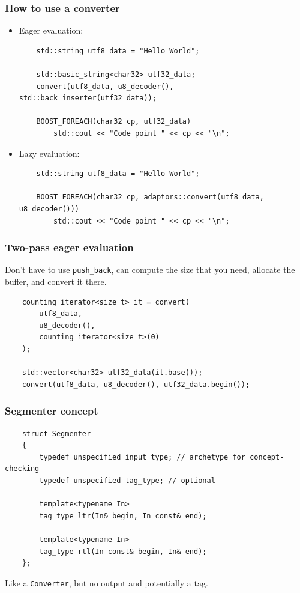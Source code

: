 \documentclass{beamer}
\begin{document}
\begin{frame}[fragile]
	\frametitle{How to use a converter}
	
	\begin{itemize}
	\item Eager evaluation:
	\begin{lstlisting}
	std::string utf8_data = "Hello World";
	
	std::basic_string<char32> utf32_data;
	convert(utf8_data, u8_decoder(), std::back_inserter(utf32_data));
	
	BOOST_FOREACH(char32 cp, utf32_data)
	    std::cout << "Code point " << cp << "\n";
	\end{lstlisting}
	
	\item Lazy evaluation:
	\begin{lstlisting}
	std::string utf8_data = "Hello World";
	
	BOOST_FOREACH(char32 cp, adaptors::convert(utf8_data, u8_decoder()))
	    std::cout << "Code point " << cp << "\n";
	\end{lstlisting}
	\end{itemize}
	
\end{frame}

\begin{frame}[fragile]
	\frametitle{Two-pass eager evaluation}
	
	Don't have to use \lstinline{push_back}, can compute the size that you need,
	allocate the buffer, and convert it there.
	\bigskip
	
	\begin{lstlisting}
	counting_iterator<size_t> it = convert(
	    utf8_data,
	    u8_decoder(),
	    counting_iterator<size_t>(0)
	);
	
	std::vector<char32> utf32_data(it.base());
	convert(utf8_data, u8_decoder(), utf32_data.begin());
	\end{lstlisting}
	
\end{frame}

\begin{frame}[fragile]
	\frametitle{Segmenter concept}
	
	\begin{lstlisting}
	struct Segmenter
	{
	    typedef unspecified input_type; // archetype for concept-checking
	    typedef unspecified tag_type; // optional
	
	    template<typename In>
	    tag_type ltr(In& begin, In const& end);
	
	    template<typename In>
	    tag_type rtl(In const& begin, In& end);		
	};
	\end{lstlisting}
	
	Like a \lstinline{Converter}, but no output and potentially a tag.
\end{frame}
\end{document}
